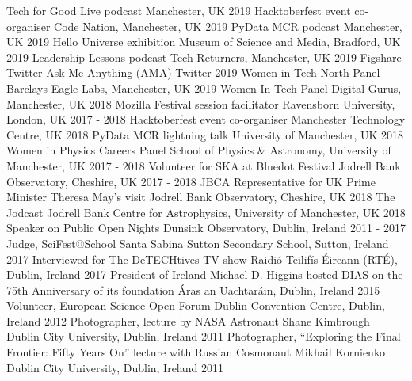 \begin{cvpress}
   \cvpres
    {Tech for Good Live podcast}
    {Manchester, UK}
    {2019}
   \cvpres
    {Hacktoberfest event co-organiser}
    {Code Nation, Manchester, UK}
    {2019}
   \cvpres
    {PyData MCR podcast}
    {Manchester, UK}
    {2019}
   \cvpres
    {Hello Universe exhibition}
    {Museum of Science and Media, Bradford, UK}
    {2019}
   \cvpres
    {Leadership Lessons podcast}
    {Tech Returners, Manchester, UK}
    {2019}
   \cvpres
    {Figshare Twitter Ask-Me-Anything (AMA)}
    {Twitter}
    {2019}
   \cvpres
    {Women in Tech North Panel}
    {Barclays Eagle Labs, Manchester, UK}
    {2019}
   \cvpres
    {Women In Tech Panel}
    {Digital Gurus, Manchester, UK}
    {2018}
   \cvpres
   {Mozilla Festival session facilitator}
    {Ravensborn University, London, UK}
    {2017 - 2018}
   \cvpres
   {Hacktoberfest event co-organiser}
    {Manchester Technology Centre, UK}
    {2018}
   \cvpres
   {PyData MCR lightning talk}
    {University of Manchester, UK}
    {2018}
   \cvpres
   {Women in Physics Careers Panel}
    {School of Physics \& Astronomy, University of Manchester, UK}
    {2017 - 2018}
   \cvpres
   {Volunteer for SKA at Bluedot Festival}
    {Jodrell Bank Observatory, Cheshire, UK}
    {2017 - 2018}
   \cvpres
   {JBCA Representative for UK Prime Minister Theresa May's visit}
    {Jodrell Bank Observatory, Cheshire, UK}
    {2018}
   \cvpres
   {The Jodcast}
    {Jodrell Bank Centre for Astrophysics, University of Manchester, UK}
    {2018}
   \cvpres
   {Speaker on Public Open Nights}
    {Dunsink Observatory, Dublin, Ireland}
    {2011 - 2017}
   \cvpres
   {Judge, SciFest@School}
    {Santa Sabina Sutton Secondary School, Sutton, Ireland}
    {2017}
   \cvpres
   {Interviewed for The DeTECHtives TV show}
    {Raidi{\'o} Teilif{\'i}s {\'E}ireann (RT{\'E}), Dublin, Ireland}
    {2017}
   \cvpres
   {President of Ireland Michael D. Higgins hosted DIAS on the 75th Anniversary of its foundation}
    {{\'A}ras an Uachtar{\'a}in, Dublin, Ireland}
    {2015}
   \cvpres
   {Volunteer, European Science Open Forum}
    {Dublin Convention Centre, Dublin, Ireland}
    {2012}
   \cvpres
   {Photographer, lecture by NASA Astronaut Shane Kimbrough}
    {Dublin City University, Dublin, Ireland}
    {2011}
   \cvpres
   {Photographer, ``Exploring the Final Frontier: Fifty Years On'' lecture with Russian Cosmonaut Mikhail Kornienko}
    {Dublin City University, Dublin, Ireland}
    {2011}
\end{cvpress}


